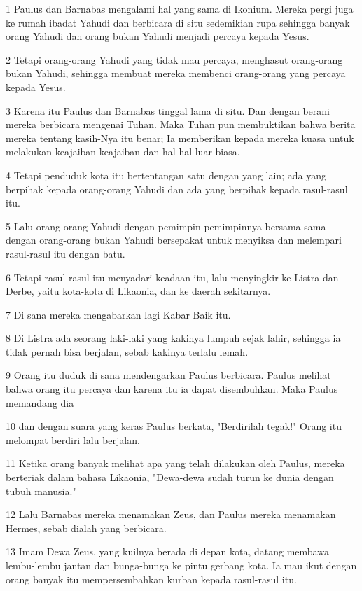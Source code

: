\par 1 Paulus dan Barnabas mengalami hal yang sama di Ikonium. Mereka pergi juga ke rumah ibadat Yahudi dan berbicara di situ sedemikian rupa sehingga banyak orang Yahudi dan orang bukan Yahudi menjadi percaya kepada Yesus.
\par 2 Tetapi orang-orang Yahudi yang tidak mau percaya, menghasut orang-orang bukan Yahudi, sehingga membuat mereka membenci orang-orang yang percaya kepada Yesus.
\par 3 Karena itu Paulus dan Barnabas tinggal lama di situ. Dan dengan berani mereka berbicara mengenai Tuhan. Maka Tuhan pun membuktikan bahwa berita mereka tentang kasih-Nya itu benar; Ia memberikan kepada mereka kuasa untuk melakukan keajaiban-keajaiban dan hal-hal luar biasa.
\par 4 Tetapi penduduk kota itu bertentangan satu dengan yang lain; ada yang berpihak kepada orang-orang Yahudi dan ada yang berpihak kepada rasul-rasul itu.
\par 5 Lalu orang-orang Yahudi dengan pemimpin-pemimpinnya bersama-sama dengan orang-orang bukan Yahudi bersepakat untuk menyiksa dan melempari rasul-rasul itu dengan batu.
\par 6 Tetapi rasul-rasul itu menyadari keadaan itu, lalu menyingkir ke Listra dan Derbe, yaitu kota-kota di Likaonia, dan ke daerah sekitarnya.
\par 7 Di sana mereka mengabarkan lagi Kabar Baik itu.
\par 8 Di Listra ada seorang laki-laki yang kakinya lumpuh sejak lahir, sehingga ia tidak pernah bisa berjalan, sebab kakinya terlalu lemah.
\par 9 Orang itu duduk di sana mendengarkan Paulus berbicara. Paulus melihat bahwa orang itu percaya dan karena itu ia dapat disembuhkan. Maka Paulus memandang dia
\par 10 dan dengan suara yang keras Paulus berkata, "Berdirilah tegak!" Orang itu melompat berdiri lalu berjalan.
\par 11 Ketika orang banyak melihat apa yang telah dilakukan oleh Paulus, mereka berteriak dalam bahasa Likaonia, "Dewa-dewa sudah turun ke dunia dengan tubuh manusia."
\par 12 Lalu Barnabas mereka menamakan Zeus, dan Paulus mereka menamakan Hermes, sebab dialah yang berbicara.
\par 13 Imam Dewa Zeus, yang kuilnya berada di depan kota, datang membawa lembu-lembu jantan dan bunga-bunga ke pintu gerbang kota. Ia mau ikut dengan orang banyak itu mempersembahkan kurban kepada rasul-rasul itu.
